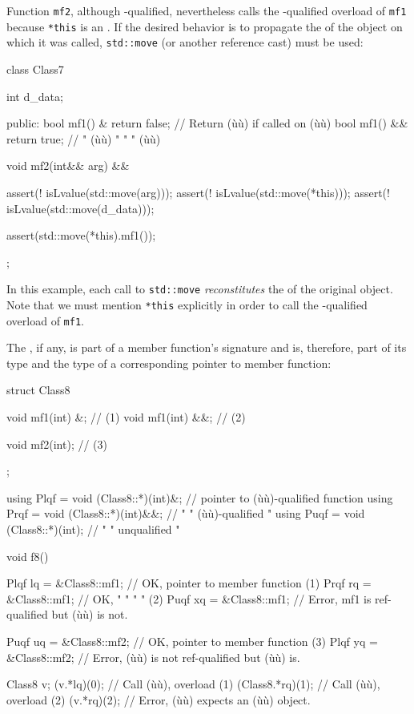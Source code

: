 \noindent Function \lstinline!mf2!, although -qualified, nevertheless
calls the -qualified overload of \lstinline!mf1! because
\lstinline!*this! is an . If the desired behavior is to
propagate the  of the object on which it was
called, \lstinline!std::move! (or another reference cast) must be used:

\begin{emcppslisting}[emcppsbatch=e2]
class Class7
{
    int d_data;

public:
    bool mf1() &  { return false; }  // Return (ù{}ù) if called on (ù{}ù)
    bool mf1() && { return true; }   //    "   (ù{}ù)   "    "    " (ù{}ù)

    void mf2(int&& arg) &&
    {
        assert(! isLvalue(std::move(arg)));
        assert(! isLvalue(std::move(*this)));
        assert(! isLvalue(std::move(d_data)));

        assert(std::move(*this).mf1());
    }
};
\end{emcppslisting}
    

\noindent In this example, each call to \lstinline!std::move! \emph{reconstitutes}
the  of the original object. Note that we must
mention \lstinline!*this! explicitly in order to call the
-qualified overload of \lstinline!mf1!.

The , if any, is part of a member function's
signature and is, therefore, part of its type and the type of a
corresponding pointer to member function:

\begin{emcppslisting}[emcppsbatch=e2]
struct Class8
{
    void mf1(int) &;   // (1)
    void mf1(int) &&;  // (2)

    void mf2(int);     // (3)
};

using Plqf = void (Class8::*)(int)&;   // pointer to (ù{}ù)-qualified function
using Prqf = void (Class8::*)(int)&&;  //    "     " (ù{}ù)-qualified     "
using Puqf = void (Class8::*)(int);    //    "     " unqualified            "

void f8()
{
    Plqf lq = &Class8::mf1;  // OK, pointer to member function (1)
    Prqf rq = &Class8::mf1;  // OK,    "     "    "       "    (2)
    Puqf xq = &Class8::mf1;  // Error, mf1 is ref-qualified but (ù{}ù) is not.

    Puqf uq = &Class8::mf2;  // OK, pointer to member function (3)
    Plqf yq = &Class8::mf2;  // Error, (ù{}ù) is not ref-qualified but (ù{}ù) is.

    Class8 v;
    (v.*lq)(0);         // Call (ù{}ù), overload (1)
    (Class8{}.*rq)(1);  // Call (ù{}ù), overload (2)
    (v.*rq)(2);         // Error, (ù{}ù) expects an (ù{}ù) object.
}
\end{emcppslisting}
    

